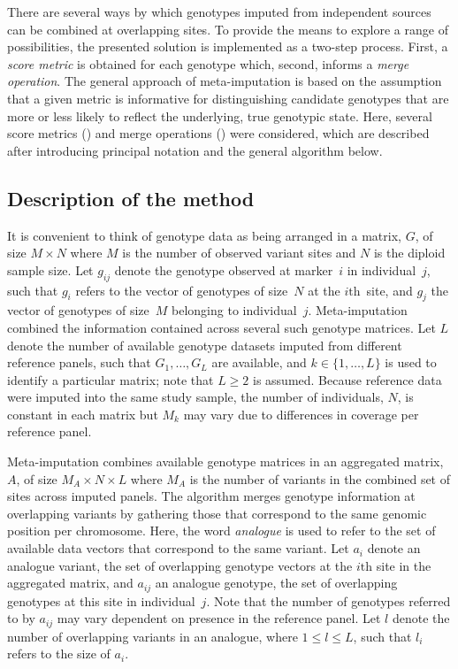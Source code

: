 There are several ways by which genotypes imputed from independent sources can be combined at overlapping sites.
To provide the means to explore a range of possibilities, the presented solution is implemented as a two-step process.
First, a \emph{score metric} is obtained for each genotype which, second, informs a \emph{merge operation}.
The general approach of meta-imputation is based on the assumption that a given metric is informative for distinguishing candidate genotypes that are more or less likely to reflect the underlying, true genotypic state.
Here, several score metrics () and  merge operations () were considered, which are described after introducing principal notation and the general algorithm below.


%
\subsection{Description of the method}
%

It is convenient to think of genotype data as being arranged in a matrix, $G$, of size ${M \times N}$ where $M$ is the number of observed variant sites and $N$ is the diploid sample size.
Let $g_{ij}$ denote the genotype observed at marker~$i$ in individual~$j$, such that $g_i$ refers to the vector of genotypes of size~$N$ at the ${i\text{th}}$~site, and $g_j$ the vector of genotypes of size~$M$ belonging to individual~$j$.
Meta-imputation combined the information contained across several such genotype matrices.
Let $L$ denote the number of available genotype datasets imputed from different reference panels, such that ${G_{1}, \dots, G_{L}}$ are available, and ${k \in \{1,\ldots,L\}}$ is used to identify a particular matrix; note that ${L \geq 2}$ is assumed.
Because reference data were imputed into the same study sample, the number of individuals, $N$, is constant in each matrix but $M_k$ may vary due to differences in coverage per reference panel.

%

%

Meta-imputation combines available genotype matrices in an aggregated matrix, $A$, of size ${M_{A} \times N \times L}$ where $M_{A}$ is the number of variants in the combined set of sites across imputed panels.
The algorithm merges genotype information at overlapping variants by gathering those that correspond to the same genomic position per chromosome.
Here, the word \emph{analogue} is used to refer to the set of available data vectors that correspond to the same variant.
Let $a_{i}$ denote an analogue variant, \ie the set of overlapping genotype vectors at the $i\text{th}$ site in the aggregated matrix, and $a_{ij}$ an analogue genotype, \ie the set of  overlapping genotypes at this site in individual~$j$.
Note that the number of genotypes referred to by $a_{ij}$ may vary dependent on presence in the reference panel.
Let $l$ denote the number of overlapping variants in an analogue, where ${1 \leq l \leq L}$, such that $l_i$ refers to the size of $a_i$.

